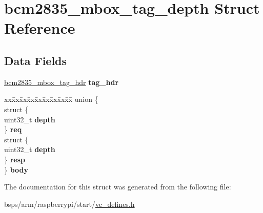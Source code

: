 \hypertarget{structbcm2835__mbox__tag__depth}{}\section{bcm2835\+\_\+mbox\+\_\+tag\+\_\+depth Struct Reference}
\label{structbcm2835__mbox__tag__depth}
\subsection*{Data Fields}
\begin{DoxyCompactItemize}
\item 
\mbox{\label{structbcm2835__mbox__tag__depth_a5a345e3745eed0a1e2f41bb86bee1266}} 
\mbox{\hyperlink{structbcm2835__mbox__tag__hdr}{bcm2835\+\_\+mbox\+\_\+tag\+\_\+hdr}} {\bfseries tag\+\_\+hdr}
\item 
\mbox{\label{structbcm2835__mbox__tag__depth_a449d11802314e0636bcfad8e70169890}} 
\begin{tabbing}
xx\=xx\=xx\=xx\=xx\=xx\=xx\=xx\=xx\=\kill
union \{\\
\>struct \{\\
\>\>uint32\_t {\bfseries depth}\\
\>\} {\bfseries req}\\
\>struct \{\\
\>\>uint32\_t {\bfseries depth}\\
\>\} {\bfseries resp}\\
\} {\bfseries body}\\

\end{tabbing}\end{DoxyCompactItemize}


The documentation for this struct was generated from the following file\+:\begin{DoxyCompactItemize}
\item 
bsps/arm/raspberrypi/start/\mbox{\hyperlink{vc__defines_8h}{vc\+\_\+defines.\+h}}\end{DoxyCompactItemize}
